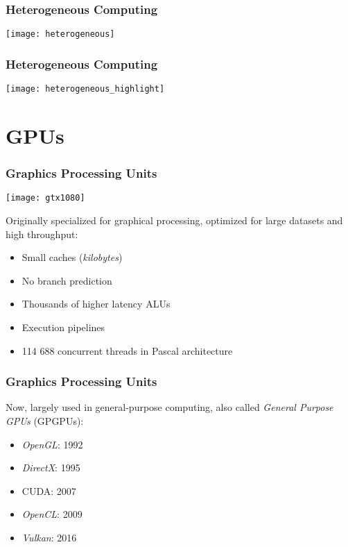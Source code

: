 \documentclass[10pt, compress]{beamer}
\begin{document}
\begin{frame}
    \frametitle{Heterogeneous Computing}
    \centering
    \texttt{[image: heterogeneous]}
\end{frame}

\begin{frame}
    \frametitle{Heterogeneous Computing}
    \centering
    \texttt{[image: heterogeneous\_highlight]}
\end{frame}

\section{GPUs}

\begin{frame}
    \frametitle{Graphics Processing Units}
    \begin{center}
        \texttt{[image: gtx1080]}
    \end{center}


    Originally specialized for \alert{graphical processing},
    optimized for large datasets and \alert{high throughput}:


    \begin{itemize}
        \item Small caches (\textit{kilobytes})

        \item No \alert{branch prediction}

        \item Thousands of \alert{higher latency} ALUs

        \item Execution \alert{pipelines}

        \item 114 688 concurrent \alert{threads} in Pascal architecture
    \end{itemize}
\end{frame}

\begin{frame}
    \frametitle{Graphics Processing Units}
    Now, largely used in general-purpose computing,
    also called \textit{General Purpose GPUs} (GPGPUs):

    \begin{itemize}
        \item \textit{OpenGL}: 1992
        \item \textit{DirectX}: 1995
        \item \alert{CUDA}: 2007
        \item \textit{OpenCL}: 2009
        \item \textit{Vulkan}: 2016
    \end{itemize}
\end{frame}
\end{document}
